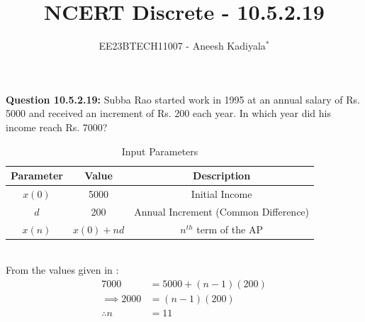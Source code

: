 \documentclass[journal,12pt,twocolumn]{IEEEtran}
\theoremstyle{remark}
\begin{document}

\vspace{3cm}

\title{NCERT Discrete - 10.5.2.19}
\author{EE23BTECH11007 - Aneesh Kadiyala$^{*}$%
}
\maketitle
\newpage
\bigskip

\renewcommand{\thefigure}{\theenumi}
\renewcommand{\thetable}{\theenumi}

\vspace{3cm}
\textbf{Question 10.5.2.19:} Subba Rao started work in 1995 at an annual salary of Rs. 5000 and received an increment of Rs. 200 each year. In which year did his income reach Rs. 7000?
\\
\solution
\begin{table}[h!]
    \centering
    \caption{Input Parameters}
    \label{tab:1}
    \begin{tabular}{ | c | c | c | }
        \hline
        Parameter & Value & Description \\
        \hline
        $x(0)$ & 5000 & Initial Income \\
        \hline
        $d$ & 200 & Annual Increment (Common Difference) \\
        \hline
        $x(n)$ & $x(0) + nd$ & $n^{th}$ term of the AP \\
        \hline
    \end{tabular}
\end{table} \\
From the values given in :
\begin{align}
7000 &= 5000 + (n - 1)(200) \\
\implies 2000 &= (n - 1)(200) \\
\therefore n &= 11
\end{align}
\end{document}
